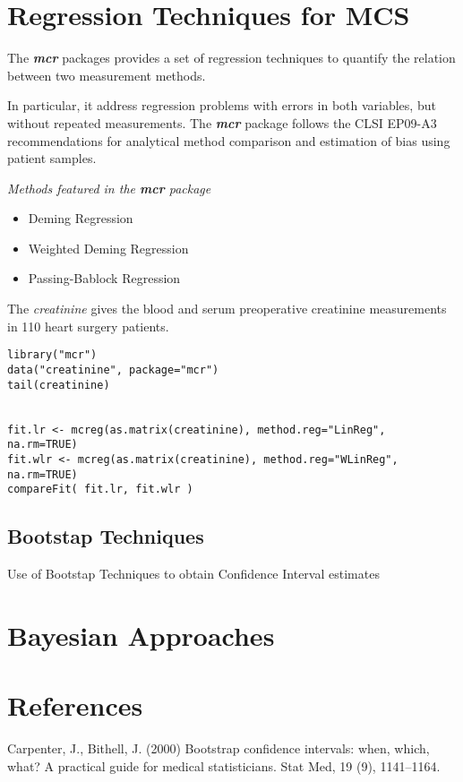 \documentclass[Chap2main.tex]{subfiles}
\begin{document}

\section{Regression Techniques for MCS}

The \textbf{\textit{mcr}} packages provides a set of regression techniques to quantify the relation between two measurement methods.

In particular, it address regression problems with errors in both variables, but without repeated measurements.
The \textbf{\textit{mcr}} package follows the CLSI EP09-A3 recommendations for analytical
method comparison and estimation of bias using patient samples.


\textit{Methods featured in the \textbf{mcr} package}

\begin{itemize}
\item Deming Regression
\item Weighted Deming Regression
\item Passing-Bablock Regression
\end{itemize}

The \textit{creatinine} gives the blood and serum preoperative creatinine measurements in 110 heart surgery patients.

\begin{framed}
\begin{verbatim}
library("mcr")
data("creatinine", package="mcr")
tail(creatinine)


fit.lr <- mcreg(as.matrix(creatinine), method.reg="LinReg", na.rm=TRUE)
fit.wlr <- mcreg(as.matrix(creatinine), method.reg="WLinReg", na.rm=TRUE)
compareFit( fit.lr, fit.wlr )
\end{verbatim}
\end{framed}


\subsection{Bootstap Techniques}
Use of Bootstap Techniques to obtain Confidence Interval estimates

\newpage
\section{Bayesian Approaches}

\newpage
\section{References}
Carpenter, J., Bithell, J. (2000) Bootstrap conﬁdence intervals: when, which, what? A practical
guide for medical statisticians. Stat Med, 19 (9), 1141–1164.
\end{document}
